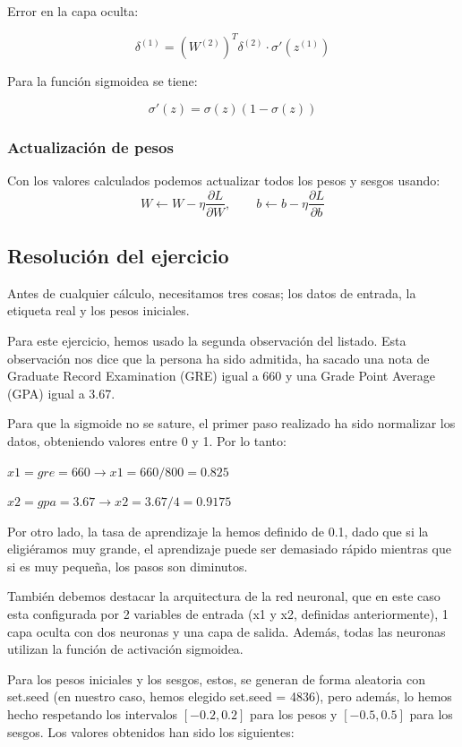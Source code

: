 \documentclass{article}
\begin{document}
Error en la capa oculta:



\[
\delta^{(1)} = (W^{(2)})^T \delta^{(2)} \cdot \sigma'(z^{(1)})
\]



Para la función sigmoidea se tiene:



\[
\sigma'(z) = \sigma(z)(1 - \sigma(z))
\]

\subsubsection*{Actualización de pesos}
Con los valores calculados podemos actualizar todos los pesos y sesgos usando:
\[
W \leftarrow W - \eta \frac{\partial L}{\partial W},
\qquad
b \leftarrow b - \eta \frac{\partial L}{\partial b}
\]

\subsection*{Resolución del ejercicio}

Antes de cualquier cálculo, necesitamos tres cosas; los datos de entrada, la etiqueta real y los pesos iniciales. 

Para este ejercicio, hemos usado la segunda observación del listado. Esta observación nos dice que la persona ha sido admitida, ha sacado una nota de Graduate Record Examination (GRE) igual a 660 y una Grade Point Average (GPA) igual a 3.67.

Para que la sigmoide no se sature, el primer paso realizado ha sido normalizar los datos, obteniendo valores entre 0 y 1. Por lo tanto:

\par $x1 = gre = 660 \rightarrow x1 = 660/800 = 0.825$
\par $x2 = gpa = 3.67 \rightarrow x2 = 3.67/4 = 0.9175$

Por otro lado, la tasa de aprendizaje la hemos definido de 0.1, dado que si la eligiéramos muy grande, el aprendizaje puede ser demasiado rápido mientras que si es muy pequeña, los pasos son diminutos.

También debemos destacar la arquitectura de la red neuronal, que en este caso esta configurada por 2 variables de entrada (x1 y x2, definidas anteriormente), 1 capa oculta con dos neuronas y una capa de salida. Además, todas las neuronas utilizan la función de activación sigmoidea.

Para los pesos iniciales y los sesgos, estos, se generan de forma aleatoria con set.seed (en nuestro caso, hemos elegido set.seed = 4836), pero además, lo hemos hecho respetando los intervalos $[-0.2, 0.2]$ para los pesos y $[-0.5,0.5]$ para los sesgos. Los valores obtenidos han sido los siguientes: 
 
\end{document}
